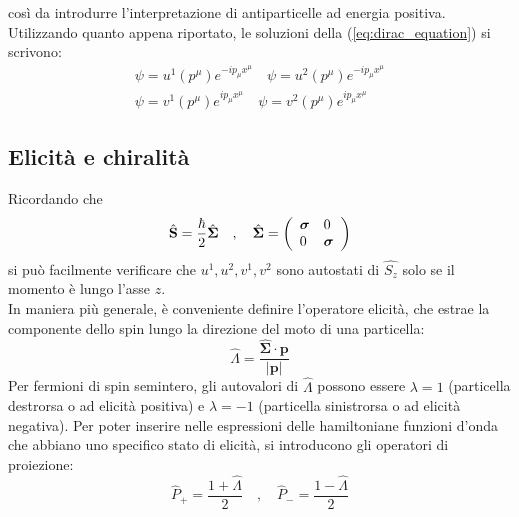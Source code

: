 \documentclass{subnucbo}
\begin{document}
così da introdurre l'interpretazione di antiparticelle ad energia positiva. Utilizzando quanto appena riportato, le soluzioni della (\ref{eq:dirac_equation}) si scrivono:
\begin{equation}
        \begin{align}
                \psi = u ^ { 1 } \left( p ^ { \mu } \right) e ^ { - i p_{\mu} x^{\mu} } \quad \psi = u ^ { 2 } \left( p ^ { \mu } \right) e ^ { - i p_{\mu} x^{\mu} } \\ \psi = v ^ { 1 } \left( p ^ { \mu } \right) e ^ {  i p_{\mu}  x^{\mu} } \quad \psi = v ^ { 2 } \left( p ^ { \mu } \right) e ^ {  i p_{\mu} x^{\mu} }
        \end{align}
        \label{eq:u1u2v1v2}
\end{equation}

\subsection{Elicità e chiralità}
Ricordando che
\begin{equation}
        \hat{\mathbf { S } } = \frac { \hbar } { 2 } \hat{\mathbf { \Sigma } } \quad , \quad \hat{\mathbf { \Sigma } } = \left( \begin{array} { l l } { \boldsymbol{\sigma }} & { 0 } \\ { 0 } & { \boldsymbol{\sigma} } \end{array} \right)
\end{equation}
si può facilmente verificare che $u^{1}, u^{2}, v^{1}, v^{2}$ sono autostati di $\hat { S _ { z } }$ solo se il momento è lungo l'asse $z$. \\
In maniera più generale, è conveniente definire l'operatore elicità, che estrae la componente dello spin lungo la direzione del moto di una particella:
\begin{equation}
        \hat { \Lambda }  = \frac { \hat { \mathbf { \Sigma } } \cdot \mathbf{p} } { |\mathbf{p}| }
        \label{eq:helicity}
\end{equation}
Per fermioni di spin semintero, gli autovalori di $\hat{\Lambda}$ possono essere $\lambda=1$ (particella destrorsa o ad elicità positiva) e $\lambda=-1$ (particella sinistrorsa o ad elicità negativa). Per poter inserire nelle espressioni delle hamiltoniane funzioni d'onda che abbiano uno specifico stato di elicità, si introducono gli operatori di proiezione:
\begin{equation}
        \hat { P } _ { + } = \frac { 1 + \hat { \Lambda } } { 2 } \quad , \quad \hat { P }_{-} = \frac { 1 - \hat { \Lambda } } { 2 }
        \label{eq:projection_operators}
\end{equation}
\end{document}
